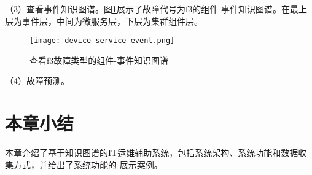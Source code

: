 （3）查看事件知识图谱。图\ref{}展示了故障代号为f3的组件-事件知识图谱。在最上层为事件层，中间为微服务层，下层为集群组件层。

\begin{figure}[htbp]
    \centering
    \texttt{[image: device-service-event.png]}
    \caption{查看f3故障类型的组件-事件知识图谱\label{device-service-event}}
\end{figure}

（4）故障预测。

\section{本章小结}
本章介绍了基于知识图谱的IT运维辅助系统，包括系统架构、系统功能和数据收集方式，并给出了系统功能的
展示案例。